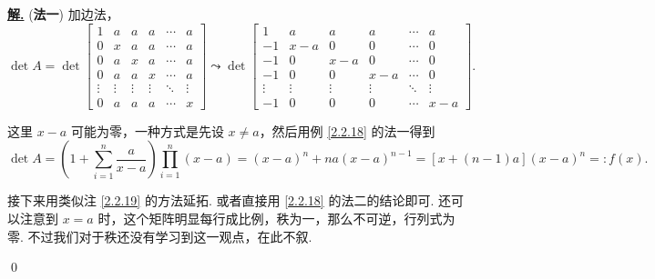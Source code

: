 \documentclass[10pt,openany]{article}
\theoremstyle{thmstyle} %
\theoremstyle{defstyle} %
\theoremstyle{prostyle} %
\theoremstyle{exastyle}
\theoremstyle{remstyle}
\newenvironment{solution}{\par\underline{\textbf{解.}} \;\fangsong}{\qed\par}
\begin{document}
\begin{solution}
	(\textbf{法一}) 加边法，
	\[ \det A= \det \begin{bmatrix}
		1 & a & a & a & \cdots & a \\
		0 & x & a & a & \cdots & a \\
		0 & a & x & a & \cdots & a \\
		0 & a & a & x & \cdots & a \\
		\vdots & \vdots & \vdots & \vdots & \ddots & \vdots \\
		0 & a & a & a & \cdots & x
	\end{bmatrix} \leadsto  \det \begin{bmatrix}
	1 & a & a & a & \cdots & a \\
	-1 & x-a & 0 & 0 & \cdots & 0 \\
	-1 & 0 & x-a & 0 & \cdots & 0 \\
	-1 & 0 & 0 & x-a & \cdots & 0 \\
	\vdots & \vdots & \vdots & \vdots & \ddots & \vdots \\
	-1 & 0 & 0 & 0 & \cdots & x-a
	\end{bmatrix}. \]
	
	这里 \( x-a \) 可能为零，一种方式是先设 \( x \neq a \)，然后用例 \ref{2.2.18} 的法一得到
	\[ \det A= \left( 1+ \sum_{i=1}^{n}\frac{a}{x-a} \right) \prod_{i=1}^{n} (x-a)= (x-a)^n+na(x-a)^{n-1}=[x+(n-1)a](x-a)^n=:f(x). \]
	
	接下来用类似注 \ref{2.2.19} 的方法延拓. 或者直接用 \ref{2.2.18} 的法二的结论即可. 还可以注意到 \( x=a \) 时，这个矩阵明显每行成比例，秩为一，那么不可逆，行列式为零. 不过我们对于秩还没有学习到这一观点，在此不叙.
	
	\vspace{1ex}
	

\end{solution}
\end{document}
